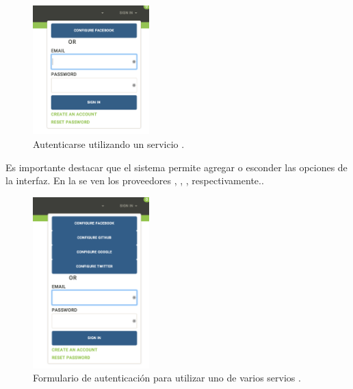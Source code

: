 \begin{figure}[H]
	\centering
	\includegraphics[width=0.4\textwidth]{figuras/architecture/accounts/login/log_in_plus_facebook.png}

	\caption{Autenticarse utilizando un servicio \thirdParty.}
	\label{figure:account:login:log_in_plus_facebook}
\end{figure}

Es importante destacar que el sistema permite agregar o esconder las opciones \thirdParty de la interfaz. En la  se ven los proveedores \oauthLoginINT \facebook, \gitHubNAME, \googleNAME, \twitterNAME respectivamente..

\begin{figure}[H]
	\centering
	\includegraphics[width=0.4\textwidth]{figuras/architecture/accounts/login/log_in_all_package.png}

	\caption{Formulario de autenticación para utilizar uno de varios servios \thirdParty.}
	\label{figure:architecture:accounts:login:log_in_all_package}
\end{figure}